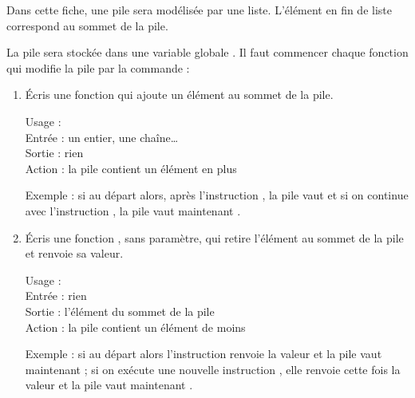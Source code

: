 \documentclass[11pt,class=report,crop=false]{standalone}
\begin{document}
\begin{activite}


Dans cette fiche, une pile sera modélisée par une liste. L'élément en fin de liste correspond au sommet de la pile.


La pile sera stockée dans une variable globale . 
Il faut commencer chaque fonction qui modifie la pile par la commande : \\
\centerline{}


\begin{enumerate}
  \item Écris une fonction  qui ajoute un élément au sommet de la pile.
  
  \begin{fonction}[\ci{empile()}]
  Usage :  \\
  Entrée : un entier, une chaîne\ldots \\
  Sortie : rien \\
  Action : la pile contient un élément en plus
  
  \medskip
    
  Exemple : si au départ  alors, après l'instruction , la pile vaut \ci{[5,1,3,8]} et si on continue avec l'instruction
, la pile vaut maintenant \ci{[5,1,3,8,6]}.     
  \end{fonction}

  \item Écris une fonction , sans paramètre, qui retire l'élément au sommet de la pile et renvoie sa valeur.
  
  \begin{fonction}[\ci{depile()}]
  Usage :  \\
  Entrée : rien \\
  Sortie : l'élément du sommet de la pile \\
  Action : la pile contient un élément de moins
  
  \medskip
    
  Exemple : si au départ  alors l'instruction  renvoie la valeur  et la pile vaut maintenant \ci{[13,4]} ; si on exécute une nouvelle instruction , elle renvoie cette fois la valeur  et la pile vaut maintenant \ci{[13]}.
  \end{fonction}
  

\end{enumerate}
\end{activite}
\end{document}
